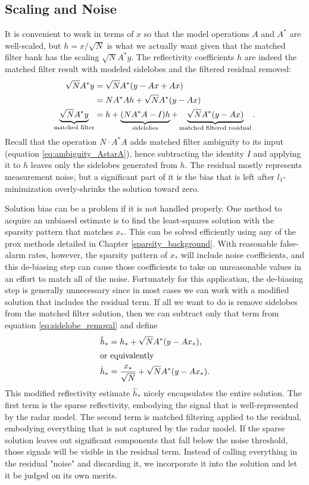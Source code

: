 \subsection{Scaling and Noise}
It is convenient to work in terms of $x$ so that the model operations $A$ and $A^*$ are well-scaled, but $h = x / \sqrt{N}$ is what we actually want given that the matched filter bank has the scaling $\sqrt{N}A^*y$. The reflectivity coefficients $h$ are indeed the matched filter result with modeled sidelobes and the filtered residual removed:
\begin{align}
 \sqrt{N} A^*y &= \sqrt{N} A^*\paren*{y - Ax + Ax}\nonumber\\
 &= N A^*Ah + \sqrt{N} A^*\paren*{y - Ax}\nonumber\\
 \underbrace{\sqrt{N} A^*y}_\text{matched filter} &= h + \underbrace{\paren*{NA^*A - I}h}_\text{sidelobes} + \underbrace{\sqrt{N} A^*\paren*{y - Ax}}_\text{matched filtered residual}\label{eq:sidelobe_removal}.
\end{align}
Recall that the operation $N \cdot A^*A$ adds matched filter ambiguity to its input (equation \ref{eq:ambiguity_AstarA}), hence subtracting the identity $I$ and applying it to $h$ leaves only the sidelobes generated from $h$. The residual mostly represents measurement noise, but a significant part of it is the bias that is left after $l_1$-minimization overly-shrinks the solution toward zero.

Solution bias can be a problem if it is not handled properly. One method to acquire an unbiased estimate is to find the least-squares solution with the sparsity pattern that matches $x_*$. This can be solved efficiently using any of the prox methods detailed in Chapter \ref{sparsity_background}. With reasonable false-alarm rates, however, the sparsity pattern of $x_*$ will include noise coefficients, and this de-biasing step can cause those coefficients to take on unreasonable values in an effort to match all of the noise. Fortunately for this application, the de-biasing step is generally unnecessary since in most cases we can work with a modified solution that includes the residual term. If all we want to do is remove sidelobes from the matched filter solution, then we can subtract only that term from equation \eqref{eq:sidelobe_removal} and define
\begin{align}
 \hat{h}_* &= h_* + \sqrt{N} A^*\paren*{y - Ax_*},\\
\intertext{or equivalently}
 \hat{h}_* &= \frac{x_*}{\sqrt{N}} + \sqrt{N} A^*\paren*{y - Ax_*}.
\end{align}
This modified reflectivity estimate $\hat{h}_*$ nicely encapsulates the entire solution. The first term is the sparse reflectivity, embodying the signal that is well-represented by the radar model. The second term is matched filtering applied to the residual, embodying everything that is not captured by the radar model. If the sparse solution leaves out significant components that fall below the noise threshold, those signals will be visible in the residual term. Instead of calling everything in the residual "noise" and discarding it, we incorporate it into the solution and let it be judged on its own merits.

